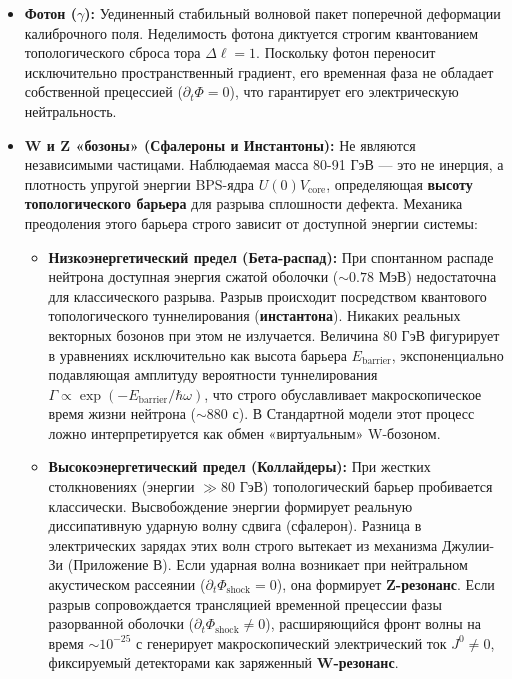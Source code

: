 \documentclass[11pt,a4paper]{article}
\begin{document}
	\begin{itemize}
		\item \textbf{Фотон ($\gamma$):} Уединенный стабильный волновой пакет поперечной деформации калиброчного поля. Неделимость фотона диктуется строгим квантованием топологического сброса тора $\Delta \ell = 1$. Поскольку фотон переносит исключительно пространственный градиент, его временная фаза не обладает собственной прецессией ($\partial_t \Phi = 0$), что гарантирует его электрическую нейтральность.
		
		\item \textbf{W и Z «бозоны» (Сфалероны и Инстантоны):} Не являются независимыми частицами. Наблюдаемая масса 80-91 ГэВ — это не инерция, а плотность упругой энергии BPS-ядра $U(0)V_{\text{core}}$, определяющая \textbf{высоту топологического барьера} для разрыва сплошности дефекта. Механика преодоления этого барьера строго зависит от доступной энергии системы:
		\begin{itemize}
			\item \textbf{Низкоэнергетический предел (Бета-распад):} При спонтанном распаде нейтрона доступная энергия сжатой оболочки ($\sim 0.78$ МэВ) недостаточна для классического разрыва. Разрыв происходит посредством квантового топологического туннелирования (\textbf{инстантона}). Никаких реальных векторных бозонов при этом не излучается. Величина 80 ГэВ фигурирует в уравнениях исключительно как высота барьера $E_{\text{barrier}}$, экспоненциально подавляющая амплитуду вероятности туннелирования $\Gamma \propto \exp(-E_{\text{barrier}}/\hbar \omega)$, что строго обуславливает макроскопическое время жизни нейтрона ($\sim 880$ с). В Стандартной модели этот процесс ложно интерпретируется как обмен «виртуальным» W-бозоном.
			\item \textbf{Высокоэнергетический предел (Коллайдеры):} При жестких столкновениях (энергии $\gg 80$ ГэВ) топологический барьер пробивается классически. Высвобождение энергии формирует реальную диссипативную ударную волну сдвига (сфалерон). Разница в электрических зарядах этих волн строго вытекает из механизма Джулии-Зи (Приложение В). Если ударная волна возникает при нейтральном акустическом рассеянии ($\partial_t \Phi_{\text{shock}} = 0$), она формирует \textbf{Z-резонанс}. Если разрыв сопровождается трансляцией временной прецессии фазы разорванной оболочки ($\partial_t \Phi_{\text{shock}} \neq 0$), расширяющийся фронт волны на время $\sim 10^{-25}$ с генерирует макроскопический электрический ток $J^0 \neq 0$, фиксируемый детекторами как заряженный \textbf{W-резонанс}.
		\end{itemize}
	\end{itemize}
	
\end{document}
